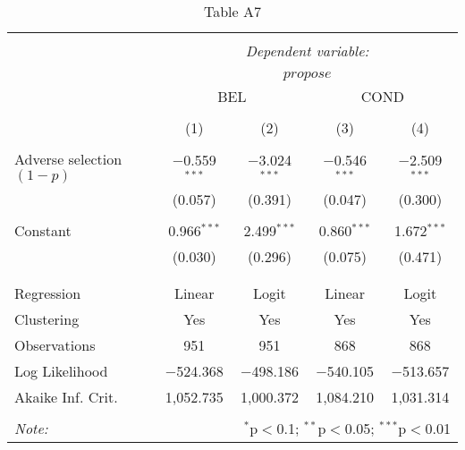 
\begin{table}[!htbp] \centering 
  \caption{Table A7} 
  \label{} 
\begin{tabular}{@{\extracolsep{5pt}}lcccc} 
\\[-1.8ex]\hline 
\hline \\[-1.8ex] 
 & \multicolumn{4}{c}{\textit{Dependent variable:}} \\ 
\cline{2-5} 
\\[-1.8ex] & \multicolumn{4}{c}{$propose$} \\ 
 & \multicolumn{2}{c}{BEL} & \multicolumn{2}{c}{COND} \\ 
\\[-1.8ex] & (1) & (2) & (3) & (4)\\ 
\hline \\[-1.8ex] 
 Adverse selection $(1-p)$ & $-$0.559$^{***}$ & $-$3.024$^{***}$ & $-$0.546$^{***}$ & $-$2.509$^{***}$ \\ 
  & (0.057) & (0.391) & (0.047) & (0.300) \\ 
  & & & & \\ 
 Constant & 0.966$^{***}$ & 2.499$^{***}$ & 0.860$^{***}$ & 1.672$^{***}$ \\ 
  & (0.030) & (0.296) & (0.075) & (0.471) \\ 
  & & & & \\ 
\hline \\[-1.8ex] 
Regression & Linear & Logit & Linear & Logit \\ 
Clustering & Yes & Yes & Yes & Yes \\ 
Observations & 951 & 951 & 868 & 868 \\ 
Log Likelihood & $-$524.368 & $-$498.186 & $-$540.105 & $-$513.657 \\ 
Akaike Inf. Crit. & 1,052.735 & 1,000.372 & 1,084.210 & 1,031.314 \\ 
\hline 
\hline \\[-1.8ex] 
\textit{Note:}  & \multicolumn{4}{r}{$^{*}$p$<$0.1; $^{**}$p$<$0.05; $^{***}$p$<$0.01} \\ 
\end{tabular} 
\end{table} 
